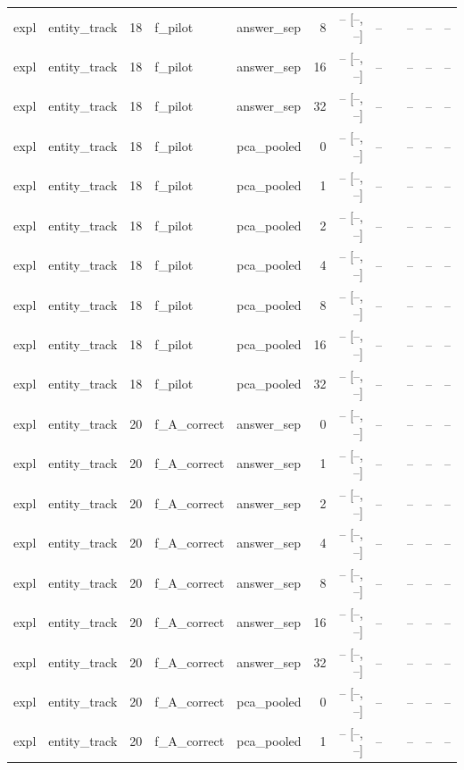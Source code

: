 \begin{tabular}{llrllrrrlrrr}
expl & entity\_track & 18 & f\_pilot & answer\_sep & 8 & -- [--, --] & -- &  & -- & -- & -- \\
expl & entity\_track & 18 & f\_pilot & answer\_sep & 16 & -- [--, --] & -- &  & -- & -- & -- \\
expl & entity\_track & 18 & f\_pilot & answer\_sep & 32 & -- [--, --] & -- &  & -- & -- & -- \\
expl & entity\_track & 18 & f\_pilot & pca\_pooled & 0 & -- [--, --] & -- &  & -- & -- & -- \\
expl & entity\_track & 18 & f\_pilot & pca\_pooled & 1 & -- [--, --] & -- &  & -- & -- & -- \\
expl & entity\_track & 18 & f\_pilot & pca\_pooled & 2 & -- [--, --] & -- &  & -- & -- & -- \\
expl & entity\_track & 18 & f\_pilot & pca\_pooled & 4 & -- [--, --] & -- &  & -- & -- & -- \\
expl & entity\_track & 18 & f\_pilot & pca\_pooled & 8 & -- [--, --] & -- &  & -- & -- & -- \\
expl & entity\_track & 18 & f\_pilot & pca\_pooled & 16 & -- [--, --] & -- &  & -- & -- & -- \\
expl & entity\_track & 18 & f\_pilot & pca\_pooled & 32 & -- [--, --] & -- &  & -- & -- & -- \\
expl & entity\_track & 20 & f\_A\_correct & answer\_sep & 0 & -- [--, --] & -- &  & -- & -- & -- \\
expl & entity\_track & 20 & f\_A\_correct & answer\_sep & 1 & -- [--, --] & -- &  & -- & -- & -- \\
expl & entity\_track & 20 & f\_A\_correct & answer\_sep & 2 & -- [--, --] & -- &  & -- & -- & -- \\
expl & entity\_track & 20 & f\_A\_correct & answer\_sep & 4 & -- [--, --] & -- &  & -- & -- & -- \\
expl & entity\_track & 20 & f\_A\_correct & answer\_sep & 8 & -- [--, --] & -- &  & -- & -- & -- \\
expl & entity\_track & 20 & f\_A\_correct & answer\_sep & 16 & -- [--, --] & -- &  & -- & -- & -- \\
expl & entity\_track & 20 & f\_A\_correct & answer\_sep & 32 & -- [--, --] & -- &  & -- & -- & -- \\
expl & entity\_track & 20 & f\_A\_correct & pca\_pooled & 0 & -- [--, --] & -- &  & -- & -- & -- \\
expl & entity\_track & 20 & f\_A\_correct & pca\_pooled & 1 & -- [--, --] & -- &  & -- & -- & -- \\

\end{tabular}
